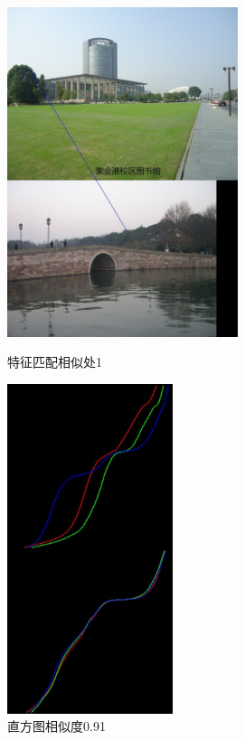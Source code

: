 \begin{figure}[htb]
\begin{minipage}[t]{0.5\linewidth}
\centering
\includegraphics[height=3.8in]{紫金港图书馆.jpg.d/im5sift.jpg}
\caption{特征匹配相似处1}
\label{fig:side:a}
\end{minipage}%
\begin{minipage}[t]{0.5\linewidth}
\centering
\includegraphics[height=3.8in]{紫金港图书馆.jpg.d/im5hist2.jpg}
\caption{直方图相似度0.91}
\label{fig:side:a}
\end{minipage}%
\end{figure}

\clearpage
